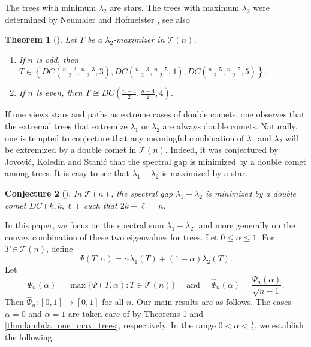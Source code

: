\documentclass[11pt]{article}
\theoremstyle{plain}
\newtheorem{theorem}{Theorem}[section]
\newtheorem{conjecture}[theorem]{Conjecture}
\numberwithin{equation}{section}
\begin{document}
The trees with minimum $\lambda_2$ are stars. The trees with maximum $\lambda_2$ were determined by Neumaier \cite{Neumaier_1982} and Hofmeister \cite{Hofmeister_1997}, see also \cite[Section 7]{KMPZ_trees_diameter_2025} 

\begin{theorem}[\cite{Neumaier_1982, Hofmeister_1997}] \label{thm:lambda_two_max_trees}
Let $T$ be a $\lambda_2$-maximizer in $\mathcal{T}(n)$. 
\begin{enumerate}[$(i)$]
    \item If $n$ is odd, then $T\in \left\{DC(\frac{n-3}{2}, \frac{n-3}{2}, 3), DC(\frac{n-3}{2}, \frac{n-5}{2}, 4), DC(\frac{n-5}{2}, \frac{n-5}{2}, 5)\right\}$.
    \item If $n$ is even, then $T\cong DC(\frac{n-4}{2}, \frac{n-4}{2}, 4)$.
\end{enumerate}
\end{theorem}

If one views stars and paths as extreme cases of double comets, one observes that the extremal trees that extremize $\lambda_1$ or $\lambda_2$ are always double comets. Naturally, one is tempted to conjecture that any meaningful combination of $\lambda_1$ and $\lambda_2$ will be extremized by a double comet in $\mathcal{T}(n)$. Indeed, it was conjectured by Jovovi\'{c}, Koledin and Stani\'{c} \cite{Stanic_2018} that the spectral gap is minimized by a double comet among trees. It is easy to see that $\lambda_1-\lambda_2$ is maximized by a star.

\begin{conjecture}[\cite{Stanic_2018}] \label{conj:spectral_gap_trees}
In $\mathcal{T}(n)$, the spectral gap $\lambda_1-\lambda_2$ is minimized by a double comet $DC(k,k,\ell)$ such that $2k+\ell=n.$
\end{conjecture}

In this paper, we focus on the spectral sum $\lambda_1+\lambda_2$, and more generally on the convex combination of these two eigenvalues for trees. Let $0\le \alpha \le 1$. For $T\in \mathcal{T}(n)$, define
\[ \Psi(T,\alpha)=\alpha\lambda_1(T)+(1-\alpha)\lambda_2(T).\]
Let 
\[ \Psi_n(\alpha)=\max\{\Psi(T,\alpha): T\in \mathcal{T}(n)\} \quad \text{ and }\quad \hat{\Psi}_n(\alpha)=\frac{\Psi_n(\alpha)}{\sqrt{n-1}}.\]
Then $\hat{\Psi}_n:[0,1]\rightarrow [0,1]$ for all $n$. Our main results are as follows. The cases $\alpha = 0$ and $\alpha =1$ are taken care of by Theorems \ref{thm:lambda_two_max_trees} and \ref{thm:lambda_one_max_trees}, respectively. In the range $ 0< \alpha < \frac{1}{2}$, we establish the following. 
\end{document}
